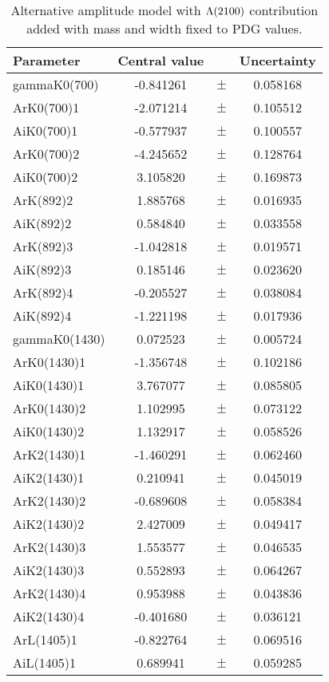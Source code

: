 \clearpage

\begin{table}
\centering
\caption{Alternative amplitude model with ${\Lambda}(2100)$ contribution added with mass and width fixed to PDG values.}
\begin{tiny}
\begin{tabular}{lccc}
\toprule
Parameter & Central value & & Uncertainty\\
\midrule 
gammaK0(700) & -0.841261 & $\pm$ & 0.058168 \\
ArK0(700)1 & -2.071214 & $\pm$ & 0.105512 \\
AiK0(700)1 & -0.577937 & $\pm$ & 0.100557 \\
ArK0(700)2 & -4.245652 & $\pm$ & 0.128764 \\
AiK0(700)2 & 3.105820 & $\pm$ & 0.169873 \\
ArK(892)2 & 1.885768 & $\pm$ & 0.016935 \\
AiK(892)2 & 0.584840 & $\pm$ & 0.033558 \\
ArK(892)3 & -1.042818 & $\pm$ & 0.019571 \\
AiK(892)3 & 0.185146 & $\pm$ & 0.023620 \\
ArK(892)4 & -0.205527 & $\pm$ & 0.038084 \\
AiK(892)4 & -1.221198 & $\pm$ & 0.017936 \\
gammaK0(1430) & 0.072523 & $\pm$ & 0.005724 \\
ArK0(1430)1 & -1.356748 & $\pm$ & 0.102186 \\
AiK0(1430)1 & 3.767077 & $\pm$ & 0.085805 \\
ArK0(1430)2 & 1.102995 & $\pm$ & 0.073122 \\
AiK0(1430)2 & 1.132917 & $\pm$ & 0.058526 \\
ArK2(1430)1 & -1.460291 & $\pm$ & 0.062460 \\
AiK2(1430)1 & 0.210941 & $\pm$ & 0.045019 \\
ArK2(1430)2 & -0.689608 & $\pm$ & 0.058384 \\
AiK2(1430)2 & 2.427009 & $\pm$ & 0.049417 \\
ArK2(1430)3 & 1.553577 & $\pm$ & 0.046535 \\
AiK2(1430)3 & 0.552893 & $\pm$ & 0.064267 \\
ArK2(1430)4 & 0.953988 & $\pm$ & 0.043836 \\
AiK2(1430)4 & -0.401680 & $\pm$ & 0.036121 \\
ArL(1405)1 & -0.822764 & $\pm$ & 0.069516 \\
AiL(1405)1 & 0.689941 & $\pm$ & 0.059285 \\

\end{tabular}
\end{tiny}
\end{table}

